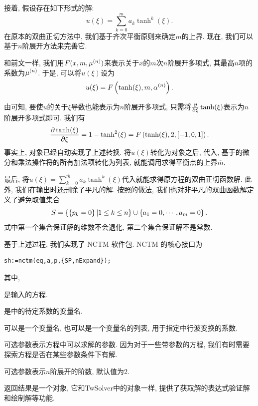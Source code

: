 接着, 假设存在如下形式的解:
\begin{equation}
    u(\xi)=\sum_{k=0}^m{a_k \tanh^k(\xi)}. \label{tanh-poly}
\end{equation}
在原本的双曲正切方法中, 我们基于齐次平衡原则来确定$m$的上界. 现在, 我们可以基于$n$阶展开方法来完善它. 

和前文一样, 我们用$F(x,m,\mu^{(n)})$来表示关于$x$的$m$次$n$阶展开多项式, 其最高$n$项的系数为$\mu^{(n)}$. 于是, 可以将$u(\xi)$设为
\begin{equation}
    u(\xi)=F\left(\tanh(\xi),m,\alpha^{(n)}\right).
\end{equation}

由可知, 要使$u$的关于$\xi$导数也能表示为$n$阶展开多项式, 只需将$\frac{\partial}{\partial \xi}\tanh(\xi)$表示为$n$阶展开多项式即可. 我们有 
\begin{equation}
    \frac{\partial \tanh(\xi)}{\partial \xi}=1-\tanh^2(\xi)=F\left(\tanh(\xi),2,[-1,0,1]\right).
\end{equation}
事实上, 对象已经自动实现了上述转换. 将$u(\xi)$转化为对象之后, 代入, 基于的微分和乘法操作将的所有加法项转化为列表, 就能调用求得平衡点的上界$\overline{m}$.

最后, 将$u(\xi)=\sum_{k=0}^{\overline{m}}{a_k \tanh^k(\xi)}$代入就能求得原方程的双曲正切函数解.  此外, 我们在输出时还删除了平凡的解. 按照的做法, 我们也对非平凡的双曲函数解定义了避免取值集合
\begin{equation}
    S=\left\{\left\{p_k=0\right\}|1\le k \le n\right\} \cup \left\{a_1=0,\cdots,a_m=0\right\}.
\end{equation}
式中第一个集合保证解的维数不会退化, 第二个集合保证解不是常数. 

基于上述过程, 我们实现了 NCTM 软件包. NCTM 的核心接口为
\begin{verbatim}
sh:=nctm(eq,a,p,{SP,nExpand});
\end{verbatim}
其中,
\begin{compactitem}[\textbullet]
\item {} 是输入的方程.
\item {} 是中的待定系数的变量名.
\item {} 可以是一个变量名, 也可以是一个变量名的列表, 用于指定中行波变换的系数.
\item 可选参数表示方程中可以求解的参数. 因为对于一些带参数的方程, 我们有时需要探索方程是否在某些参数条件下有解.
\item 可选参数表示$n$阶展开的阶数, 默认值为2.
\item 返回结果是一个对象, 它和TwSolver中的对象一样, 提供了获取解的表达式\D 验证解和绘制解等功能. 
\end{compactitem}


